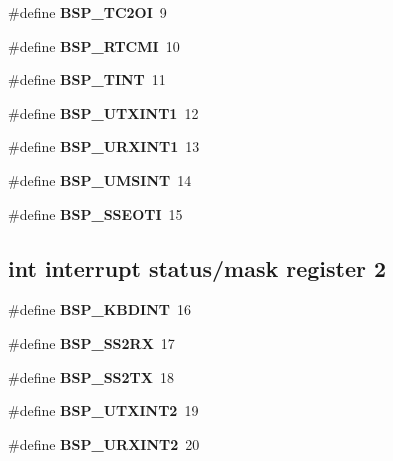 \begin{DoxyCompactItemize}
\#define {\bfseries B\+S\+P\+\_\+\+T\+C2\+OI}~9
\item 
\mbox{\label{group__edb7312__interrupt_gac781cee50bb10ae5165cfd7f9b939f0e}} 
\#define {\bfseries B\+S\+P\+\_\+\+R\+T\+C\+MI}~10
\item 
\mbox{\label{group__edb7312__interrupt_ga030b024f7b7a0254213eeeed47b9e96b}} 
\#define {\bfseries B\+S\+P\+\_\+\+T\+I\+NT}~11
\item 
\mbox{\label{group__edb7312__interrupt_gadc2a11ef33498a0543c7de3eb54edb95}} 
\#define {\bfseries B\+S\+P\+\_\+\+U\+T\+X\+I\+N\+T1}~12
\item 
\mbox{\label{group__edb7312__interrupt_ga69b345843a31c2b35460193abd6b6997}} 
\#define {\bfseries B\+S\+P\+\_\+\+U\+R\+X\+I\+N\+T1}~13
\item 
\mbox{\label{group__edb7312__interrupt_ga7630ce624848a61a0c25c23555953499}} 
\#define {\bfseries B\+S\+P\+\_\+\+U\+M\+S\+I\+NT}~14
\item 
\mbox{\label{group__edb7312__interrupt_ga35890e92c4cf05c63e0f2e30ca2c1c7e}} 
\#define {\bfseries B\+S\+P\+\_\+\+S\+S\+E\+O\+TI}~15
\end{DoxyCompactItemize}
\subsection*{int interrupt status/mask register 2}
\begin{DoxyCompactItemize}
\item 
\mbox{\label{group__edb7312__interrupt_ga435b472c814782c1401fcbb273698bbc}} 
\#define {\bfseries B\+S\+P\+\_\+\+K\+B\+D\+I\+NT}~16
\item 
\mbox{\label{group__edb7312__interrupt_ga6537e631e1d43449e2209fc3c77c4d97}} 
\#define {\bfseries B\+S\+P\+\_\+\+S\+S2\+RX}~17
\item 
\mbox{\label{group__edb7312__interrupt_gaa7bd981dcdc1dc6d7b34e4f8df5b28a7}} 
\#define {\bfseries B\+S\+P\+\_\+\+S\+S2\+TX}~18
\item 
\mbox{\label{group__edb7312__interrupt_ga72bceb8fb9b837211cd8c42922c3b738}} 
\#define {\bfseries B\+S\+P\+\_\+\+U\+T\+X\+I\+N\+T2}~19
\item 
\mbox{\label{group__edb7312__interrupt_ga2b2e7a235566f0b161f8608ab53ba567}} 
\#define {\bfseries B\+S\+P\+\_\+\+U\+R\+X\+I\+N\+T2}~20
\end{DoxyCompactItemize}
